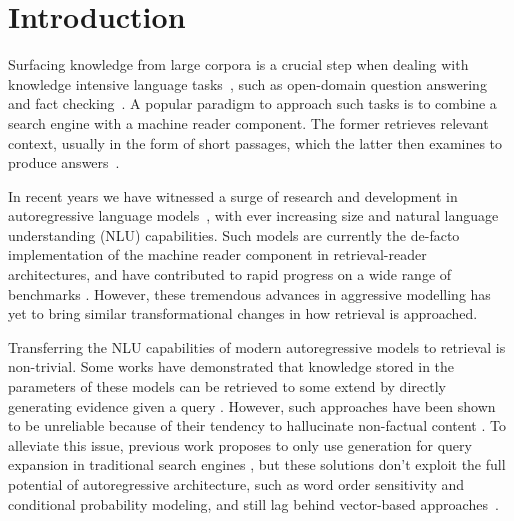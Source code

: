 \section{Introduction}

Surfacing knowledge from large corpora is a crucial step when dealing with knowledge intensive language tasks~\cite{levy2017zero,dinan2018wizard,elsahar2019t,petroni-etal-2021-kilt}, such as open-domain question answering~\cite{voorhees1999trec,joshi2017triviaqa,yang2018hotpotqa,kwiatkowski-etal-2019-natural} and fact checking~\cite{Thorne18Fever}. 
A  popular paradigm to approach such tasks is to combine a search engine with a machine reader component. The former retrieves relevant context, usually in the form of short passages, which the latter then examines to produce answers~\cite{DBLP:journals/corr/ChenFWB17,lewis2020retrievalaugmented, izacard-grave-2021-leveraging}. 

In recent years we have witnessed a surge of research and development in autoregressive language models~\cite{radford2019language, Lewis2019BARTDS, 2019t5, brown2020language, rae2021scaling, artetxe2021efficient, smith2022using}, with ever increasing size and natural language understanding (NLU) capabilities. Such models are currently the de-facto implementation of the machine reader component in retrieval-reader architectures, and have contributed to rapid progress on a wide range of benchmarks \cite{joshi2017triviaqa,kwiatkowski-etal-2019-natural, petroni-etal-2021-kilt}. 
However, these tremendous advances in aggressive modelling has yet to bring similar transformational changes in  how retrieval is approached.

Transferring the NLU capabilities of modern autoregressive models to retrieval  is non-trivial. 
Some works have demonstrated that knowledge stored in the parameters of these models can be retrieved to some extend by directly generating evidence given a query \cite{petroni2019language, petroni2020context, roberts2020much}.
However, such approaches have been shown to be unreliable because of their tendency to hallucinate non-factual content \cite{massarelli2019decoding, Metzler:Rethinking21, Ji2022SurveyOH}.
To alleviate this issue, previous work proposes to only use generation for query expansion in traditional search engines \citep{mao-etal-2021-generation}, but these solutions don't exploit the full potential of autoregressive architecture, such as word order sensitivity and conditional probability modeling, and still lag behind vector-based approaches~\cite{karpukhin-etal-2020-dense}.

